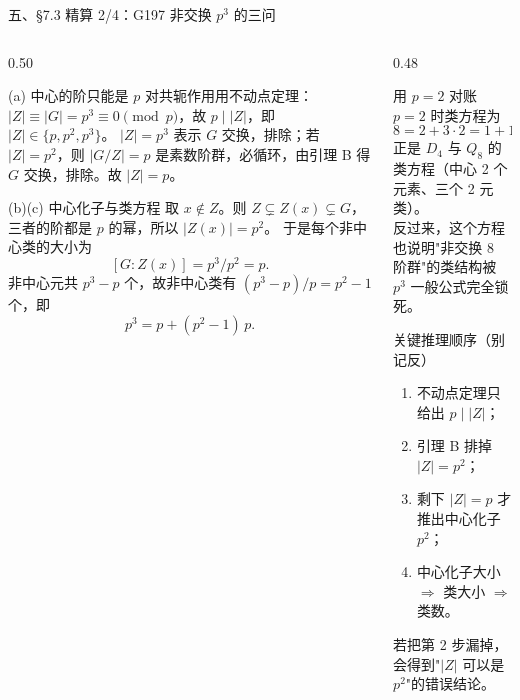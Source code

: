 \documentclass[aspectratio=169,10pt,fontset=none]{ctexbeamer}
\begin{document}
\begin{frame}[t]{五、\S7.3 精算 2/4：G197 非交换 $p^3$ 的三问}
  \begin{columns}[T,onlytextwidth]
    \begin{column}{0.50\textwidth}
      \begin{block}{\footnotesize (a) 中心的阶只能是 $p$}
        \scriptsize
        对共轭作用用不动点定理：$|Z|\equiv|G|=p^3\equiv0\pmod p$，故 $p\mid|Z|$，即 $|Z|\in\{p,p^2,p^3\}$。
        $|Z|=p^3$ 表示 $G$ 交换，排除；若 $|Z|=p^2$，则 $|G/Z|=p$ 是素数阶群，必循环，由引理 B 得 $G$ 交换，排除。故 $|Z|=p$。
      \end{block}
      \begin{block}{\footnotesize (b)(c) 中心化子与类方程}
        \scriptsize
        取 $x\notin Z$。则 $Z\subsetneq Z(x)\subsetneq G$，三者的阶都是 $p$ 的幂，所以 $|Z(x)|=p^2$。
        于是每个非中心类的大小为
        \[ [G:Z(x)]=p^3/p^2=p. \]
        非中心元共 $p^3-p$ 个，故非中心类有 $(p^3-p)/p=p^2-1$ 个，即
        \[ p^3=p+(p^2-1)\,p. \]
      \end{block}
    \end{column}
    \begin{column}{0.48\textwidth}
      \begin{exampleblock}{\footnotesize 用 $p=2$ 对账}
        \scriptsize
        $p=2$ 时类方程为
        \[ 8=2+3\cdot2=1+1+2+2+2, \]
        正是 $D_4$ 与 $Q_8$ 的类方程（中心 2 个元素、三个 2 元类）。\\
        反过来，这个方程也说明"非交换 8 阶群"的类结构被 $p^3$ 一般公式完全锁死。
      \end{exampleblock}
      \begin{alertblock}{\footnotesize 关键推理顺序（别记反）}
        \scriptsize
        \begin{enumerate}\setlength{\itemsep}{1pt}
          \item 不动点定理只给出 $p\mid|Z|$；
          \item 引理 B 排掉 $|Z|=p^2$；
          \item 剩下 $|Z|=p$ 才推出中心化子 $p^2$；
          \item 中心化子大小 $\Rightarrow$ 类大小 $\Rightarrow$ 类数。
        \end{enumerate}
        若把第 2 步漏掉，会得到"$|Z|$ 可以是 $p^2$"的错误结论。
      \end{alertblock}
    \end{column}
  \end{columns}
\end{frame}
\end{document}
